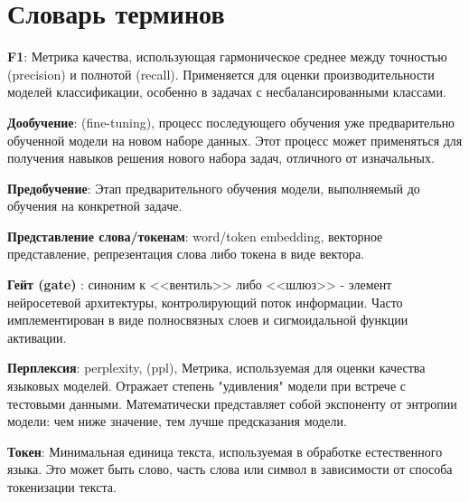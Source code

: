 \chapter*{Словарь терминов}             %

\textbf{F1}: Метрика качества, использующая гармоническое среднее между точностью (precision) и полнотой (recall). Применяется для оценки производительности моделей классификации, особенно в задачах с несбалансированными классами.

\textbf{Дообучение}: (fine-tuning), процесс последующего обучения уже предварительно обученной модели на новом наборе данных. Этот процесс может применяться для получения навыков решения нового набора задач, отличного от изначальных.

\textbf{Предобучение}: Этап предварительного обучения модели, выполняемый до обучения на конкретной задаче.

\textbf{Представление слова/токенам}: word/token embedding, векторное представление, репрезентация слова либо токена в виде вектора.

\textbf{Гейт (gate)} : синоним к <<вентиль>> либо <<шлюз>> - элемент нейросетевой архитектуры, контролирующий поток информации. Часто имплементирован в виде полносвязных слоев и сигмоидальной функции активации.

\textbf{Перплексия}: perplexity, (ppl), Метрика, используемая для оценки качества языковых моделей. Отражает степень "удивления" модели при встрече с тестовыми данными. Математически представляет собой экспоненту от энтропии модели: чем ниже значение, тем лучше предсказания модели.

\textbf{Токен}: Минимальная единица текста, используемая в обработке естественного языка. Это может быть слово, часть слова или символ в зависимости от способа токенизации текста.
